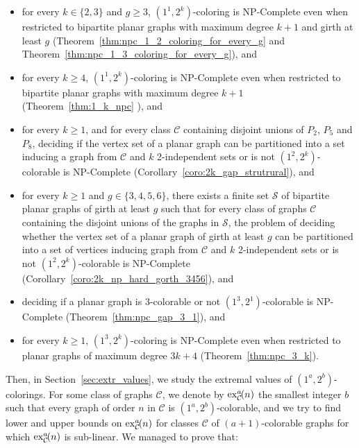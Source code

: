 \documentclass{article}
\newcommand{\colo}[2]{(1^{#1}, 2^{#2})}
\newcommand{\ex}[3]{\operatorname{ex}^{#1}_{#2}\hspace{-3pt}{#3}}
\begin{document}
\begin{itemize}
    \item for every $k \in \{2, 3\}$ and $g \geq 3$, {\sc $\colo{1}{k}$-coloring} is NP-Complete even when restricted to bipartite planar graphs with maximum degree $k + 1$ and girth at least $g$ (Theorem~\ref{thm:npc_1_2_coloring_for_every_g} and Theorem~\ref{thm:npc_1_3_coloring_for_every_g}), and
    \item for every $k \geq 4$, {\sc $\colo{1}{k}$-coloring} is NP-Complete even when restricted to bipartite planar graphs with maximum degree $k + 1$ (Theorem~\ref{thm:1_k_npc}
    ), and
    \item for every $k \geq 1$, and for every class $\mathcal{C}$ containing disjoint unions of $P_2$, $P_5$ and $P_8$, deciding if the vertex set of a planar graph can be partitioned into a set inducing a graph from $\mathcal{C}$ and $k$ 2-independent sets or is not $\colo{2}{k}$-colorable is NP-Complete (Corollary~\ref{coro:2k_gap_strutrural}), and
    \item for every $k \geq 1$ and $g \in \{3, 4, 5, 6\}$, there exists a finite set $\mathcal{S}$ of bipartite planar graphs of girth at least $g$ such that for every class of graphs $\mathcal{C}$ containing the disjoint unions of the graphs in $\mathcal{S}$, the problem of deciding whether the vertex set of a planar graph of girth at least $g$ can be partitioned into a set of vertices inducing graph from $\mathcal{C}$ and $k$ 2-independent sets or is not $\colo{2}{k}$-colorable is NP-Complete (Corollary~\ref{coro:2k_np_hard_gorth_3456}), and
    \item deciding if a planar graph is $3$-colorable or not $\colo{3}{1}$-colorable is NP-Complete (Theorem~\ref{thm:npc_gap_3_1}), and 
    \item for every $k \geq 1$, {\sc $\colo{3}{k}$-coloring} is NP-Complete even when restricted to planar graphs of maximum degree $3k + 4$ (Theorem~\ref{thm:npc_3_k}).
\end{itemize}


 Then, in Section~\ref{sec:extr_values}, we study the extremal values of $\colo{a}{b}$-colorings. For some class of graphs $\mathcal{C}$, we denote by $\ex{a}{\mathcal{C}}{(n)}$ the smallest integer $b$ such that every graph of order $n$ in $\mathcal{C}$ is $\colo{a}{b}$-colorable, and we try to find lower and upper bounds on $\ex{a}{\mathcal{C}}{(n)}$ for classes $\mathcal{C}$ of $(a + 1)$-colorable graphs for which $\ex{a}{\mathcal{C}}{(n)}$ is sub-linear. We managed to prove that:
\end{document}
